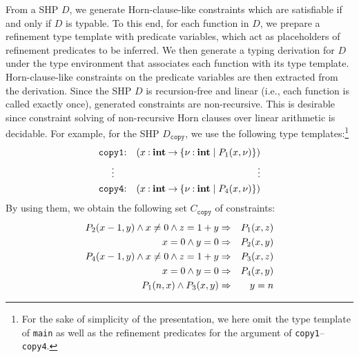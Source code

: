 From a SHP \(D\), we generate Horn-clause-like constraints which are
satisfiable if and only if \(D\) is typable.  To this end, for each
function in \(D\), we prepare a refinement type template with predicate
variables, which act as placeholders of refinement predicates to be
inferred.  We then generate a typing derivation for \(D\) under the type
environment that associates each function with its type template.
Horn-clause-like constraints on the predicate variables are then
extracted from the derivation.  Since the SHP \(D\) is recursion-free
and linear (i.e., each function is called exactly once), generated
constraints are non-recursive.  This is desirable since constraint
solving of non-recursive Horn clauses over linear arithmetic is
decidable.  For example, for the SHP \(D_{\texttt{copy}}\), we use the
following type templates:\footnote{For the sake of simplicity of the
presentation, we here omit the type template of \texttt{main} as well as
the refinement predicates for the argument of
\texttt{copy1}--\texttt{copy4}.}
\begin{eqnarray*}
\texttt{copy1}&\mathbin{:}&(x\mathbin{:}{\mathbf{int}}\mathbin{\rightarrow}{\{{\nu\mathbin{:}\mathbf{int} \mid P_1(x,\nu)}\}}) \\
\vdots\quad &&\qquad\qquad \vdots \\
\texttt{copy4}&\mathbin{:}&(x\mathbin{:}{\mathbf{int}}\mathbin{\rightarrow}{\{{\nu\mathbin{:}\mathbf{int} \mid P_4(x,\nu)}\}})
\end{eqnarray*}
By using them, we obtain the following set \(C_{\texttt{copy}}\) of
constraints:
\begin{eqnarray*}
P_2(x-1,y) \land x\neq0 \land z=1+y &\Rightarrow& P_1(x,z) \\
x=0 \land y=0 &\Rightarrow& P_2(x,y) \\
P_4(x-1,y) \land x\neq0 \land z=1+y &\Rightarrow& P_3(x,z) \\
x=0 \land y=0 &\Rightarrow& P_4(x,y) \\
P_1(n,x) \land P_3(x,y) &\Rightarrow& y=n
\end{eqnarray*}

